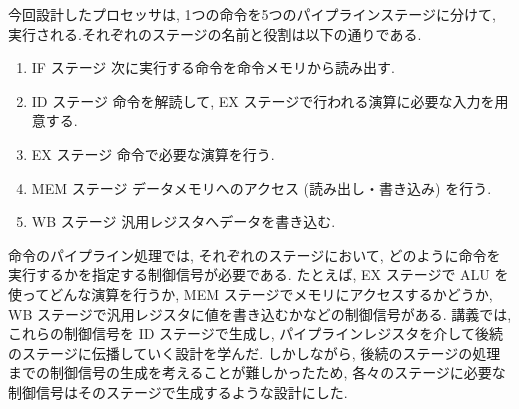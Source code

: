 \documentclass[../specifications.tex]{subfiles}
\begin{document}
  今回設計したプロセッサは, 1つの命令を5つのパイプラインステージに分けて, 
  実行される.それぞれのステージの名前と役割は以下の通りである.
  \begin{enumerate}
    \item IF ステージ
    \newline 次に実行する命令を命令メモリから読み出す.

    \item ID ステージ
    \newline 命令を解読して, EX ステージで行われる演算に必要な入力を用意する.

    \item EX ステージ
    \newline 命令で必要な演算を行う.

    \item MEM ステージ
    \newline データメモリへのアクセス (読み出し・書き込み) を行う.

    \item WB ステージ
    \newline 汎用レジスタへデータを書き込む.
  \end{enumerate}

  命令のパイプライン処理では, それぞれのステージにおいて, 
  どのように命令を実行するかを指定する制御信号が必要である.
  たとえば, EX ステージで ALU を使ってどんな演算を行うか, 
  MEM ステージでメモリにアクセスするかどうか, 
  WB ステージで汎用レジスタに値を書き込むかなどの制御信号がある.
  講義では, これらの制御信号を ID ステージで生成し, 
  パイプラインレジスタを介して後続のステージに伝播していく設計を学んだ.
  しかしながら, 後続のステージの処理までの制御信号の生成を考えることが難しかったため, 
  各々のステージに必要な制御信号はそのステージで生成するような設計にした.

  
\end{document}
